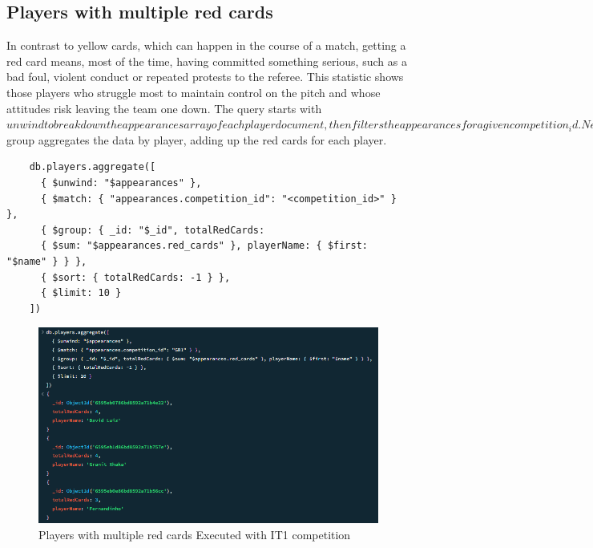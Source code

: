\documentclass{Configuration_Files/PoliMi3i_thesis}
\begin{document}
\subsection{Players with multiple red cards}
In contrast to yellow cards, which can happen in the course of a match, getting a red card means, most of the time, having committed something serious, such as a bad foul, violent conduct or repeated protests to the referee. This statistic shows those players who struggle most to maintain control on the pitch and whose attitudes risk leaving the team one down. The query starts with $unwind to break down the appearances array of each player document, then filters the appearances for a given competition_id. Next, $group aggregates the data by player, adding up the red cards for each player. 
\begin{verbatim}
    db.players.aggregate([
      { $unwind: "$appearances" },
      { $match: { "appearances.competition_id": "<competition_id>" } },
      { $group: { _id: "$_id", totalRedCards: 
      { $sum: "$appearances.red_cards" }, playerName: { $first: "$name" } } },
      { $sort: { totalRedCards: -1 } },
      { $limit: 10 }
    ])
\end{verbatim}
\begin{figure}[htbp]
    \centering
    \includegraphics[scale=0.9]{Images/Queries/Competitions_statistics/red-cards/GB1.png}
    \caption{Players with multiple red cards Executed with IT1 competition}
\end{figure}
\end{document}
